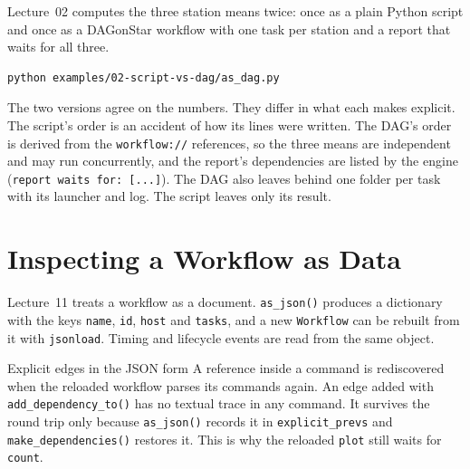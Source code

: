 Lecture~02 computes the three station means twice: once as a plain Python
script and once as a DAGonStar workflow with one task per station and a
report that waits for all three.



\begin{lstlisting}[style=bash]
python examples/02-script-vs-dag/as_dag.py
\end{lstlisting}



The two versions agree on the numbers. They differ in what each makes explicit. The
script's order is an accident of how its lines were written. The DAG's order
is derived from the \texttt{workflow://} references, so the three means are
independent and may run concurrently, and the report's dependencies are
listed by the engine (\texttt{report waits for: [...]}). The DAG also leaves
behind one folder per task with its launcher and log. The script leaves only
its result.

\section{Inspecting a Workflow as Data}

Lecture~11 treats a workflow as a document. \texttt{as\_json()} produces a
dictionary with the keys \texttt{name}, \texttt{id}, \texttt{host} and
\texttt{tasks}, and a new \texttt{Workflow} can be rebuilt from it with
\texttt{jsonload}. Timing and lifecycle events are read from the same
object.





\begin{definitionbox}{Explicit edges in the JSON form}
A reference inside a command is rediscovered when the reloaded workflow
parses its commands again. An edge added with \texttt{add\_dependency\_to()}
has no textual trace in any command. It survives the round trip only because
\texttt{as\_json()} records it in \texttt{explicit\_prevs} and
\texttt{make\_dependencies()} restores it. This is why the reloaded
\texttt{plot} still waits for \texttt{count}.
\end{definitionbox}

